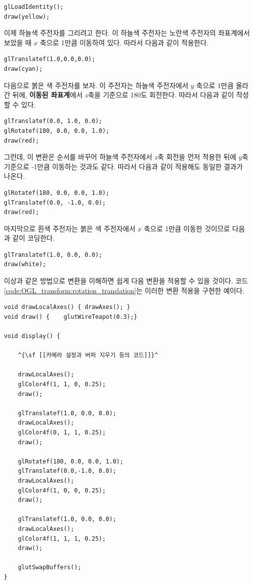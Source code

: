\begin{verbatim}
glLoadIdentity();
draw(yellow);
\end{verbatim}

이제 하늘색 주전자를 그리려고 한다. 이 하늘색 주전자는 노란색 주전자의 좌표계에서 보았을 때 $x$ 축으로 1만큼 이동하여 있다. 따라서 다음과 같이 적용한다.

\begin{verbatim}
glTranslatef(1.0,0.0,0.0);
draw(cyan);
\end{verbatim}

다음으로 붉은 색 주전자를 보자. 이 주전자는 하늘색 주전자에서 $y$ 축으로 1만큼 올라간 뒤에, {\bf 이동된 좌표계}에서 $z$축을 기준으로 180도 회전한다. 따라서 다음과 같이 작성할 수 있다.

\begin{verbatim}
glTranslatef(0.0, 1.0, 0.0);
glRotatef(180, 0.0, 0.0, 1.0);
draw(red);
\end{verbatim}

그런데, 이 변환은 순서를 바꾸어 하늘색 주전자에서 $z$축 회전을 먼저 적용한 뒤에 $y$축 기준으로 -1만큼 이동하는 것과도 같다. 따라서 다음과 같이 적용해도 동일한 결과가 나온다.

\begin{verbatim}
glRotatef(180, 0.0, 0.0, 1.0);
glTranslatef(0.0, -1.0, 0.0);
draw(red);
\end{verbatim}

마지막으로 흰색 주전자는 붉은 색 주전자에서 $x$ 축으로 1만큼 이동한 것이므로 다음과 같이 코딩한다.

\begin{verbatim}
glTranslatef(1.0, 0.0, 0.0);
draw(white);
\end{verbatim}

이상과 같은 방법으로 변환을 이해하면 쉽게 다음 변환을 적용할 수 있을 것이다. 
코드 \ref{code:OGL_transform:rotation_translation}는 이러한 변환 적용을 구현한 예이다.

\begin{algorithmbis}\label{code:OGL_transform:rotation_translation}
\lstset{language=C++, escapechar=^} 
\begin{lstlisting}
void drawLocalAxes() { drawAxes(); }
void draw() {    glutWireTeapot(0.3);}

void display() {

    ^{\sf [[카메라 설정과 버퍼 지우기 등의 코드]]}^

    drawLocalAxes();
    glColor4f(1, 1, 0, 0.25);
    draw();
    
    glTranslatef(1.0, 0.0, 0.0);
    drawLocalAxes();
    glColor4f(0, 1, 1, 0.25);
    draw();
    
    glRotatef(180, 0.0, 0.0, 1.0);
    glTranslatef(0.0,-1.0, 0.0);
    drawLocalAxes();
    glColor4f(1, 0, 0, 0.25);
    draw();
    
    glTranslatef(1.0, 0.0, 0.0);
    drawLocalAxes();
    glColor4f(1, 1, 1, 0.25);
    draw();
    
    glutSwapBuffers();
}

\end{lstlisting}
\end{algorithmbis}


